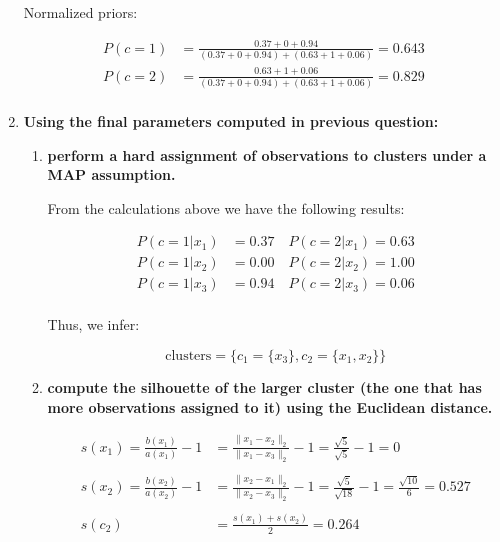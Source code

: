 \documentclass[12pt]{article}
\begin{document}
\begin{enumerate}
    \newpage
    Normalized priors:

    \begin{equation*}
        \begin{aligned}
            P(c=1) &= \frac{0.37+0+0.94}{(0.37+0+0.94) + (0.63+1+0.06)} = 0.643\\
            P(c=2) &= \frac{0.63+1+0.06}{(0.37+0+0.94) + (0.63+1+0.06)} = 0.829\\
        \end{aligned}
    \end{equation*}

    \vspace{10pt}
    \item \textbf{Using the ﬁnal parameters computed in previous question:}
    \begin{enumerate}[label=\alph*)]
        \item \textbf{perform a hard assignment of observations to clusters under a MAP assumption.}
        
        \vspace{10pt}
        From the calculations above we have the following results:

        \begin{equation*}
            \begin{aligned}
                P(c=1|x_1) &= 0.37 \quad P(c=2|x_1) = 0.63\\
                P(c=1|x_2) &= 0.00 \quad P(c=2|x_2) = 1.00\\
                P(c=1|x_3) &= 0.94 \quad P(c=2|x_3) = 0.06\\
            \end{aligned}
        \end{equation*}

        Thus, we infer:

        \begin{equation*}
                \text{clusters} = \{c_1=\{x_3\},c_2=\{x_1, x_2\}\}
        \end{equation*}

        \item \textbf{compute the silhouette of the larger cluster (the one that has more observations
        assigned to it) using the Euclidean distance.}

        \begin{equation*}
            \begin{aligned}
                s(x_1) = \frac{b(x_1)}{a(x_1)} - 1 &= \frac{\|x_1-x_2\|_2}{\|x_1-x_3\|_2} - 1 = \frac{\sqrt{5}}{\sqrt{5}} - 1 = 0\\
                \\
                s(x_2) = \frac{b(x_2)}{a(x_2)} - 1 &= \frac{\|x_2-x_1\|_2}{\|x_2-x_3\|_2} - 1 = \frac{\sqrt{5}}{\sqrt{18}} - 1 = \frac{\sqrt{10}}{6} = 0.527\\
                \\
                s(c_2) &= \frac{s(x_1) + s(x_2)}{2} = 0.264
            \end{aligned}
        \end{equation*}

    \end{enumerate}
\end{enumerate}
\end{document}
